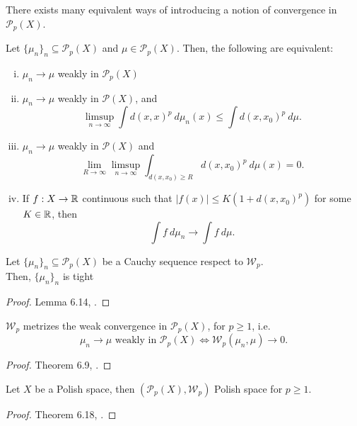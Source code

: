 \documentclass[../main.tex]{subfiles}
\begin{document}
There exists many equivalent ways of introducing a notion of convergence in $\mathcal{P}_p(X)$.

\begin{proposition}
    \label{prop:equiv_statement_weak_conv_P_p(X)}
    Let $\{\mu_n\}_n\subseteq\mathcal{P}_p(X)$ and $\mu\in\mathcal{P}_p(X)$. Then, the following are equivalent:
    \begin{enumerate}[(i)]
        \item $\mu_n \to \mu$ weakly in $\mathcal{P}_p(X)$
        \item $\mu_n \to \mu$ weakly in $\mathcal{P}(X)$, and 
        $$
        \limsup_{n\to\infty} \int d(x, x)^p \ d\mu_n(x) \leq \int d(x, x_0)^p \ d\mu.
        $$
        \item $\mu_n\to \mu$ weakly in $\mathcal{P}(X)$ and
        $$
        \lim_{R\to\infty} \limsup_{n\to\infty} \int_{d(x, x_0)\geq R} d(x, x_0)^p \ d\mu(x) = 0.
        $$
        \item If $f: X\to \mathbb{R}$ continuous such that $|f(x)|\leq K(1+d(x, x_0)^p)$ for some $K\in\mathbb{R}$, then
        $$
        \int f \ d\mu_n \to \int f \ d\mu. 
        $$
    \end{enumerate}
\end{proposition}

\begin{lemma}
    \label{lemma:cauchy_in_P_p(X)}
    Let $\{\mu_n\}_n\subseteq \mathcal{P}_p(X)$ be a Cauchy sequence respect to $\mathcal{W}_p$. \\
    Then, $\{\mu_n\}_n$ is tight
\end{lemma}
\begin{proof}
    Lemma 6.14, \cite{villani2009optimal}.
\end{proof}

\begin{theorem}
    $\mathcal{W}_p$ metrizes the weak convergence in $\mathcal{P}_p(X)$, for $p\geq 1$, i.e. $$\mu_n\to\mu \text{ weakly in } \mathcal{P}_p(X) \iff \mathcal{W}_p(\mu_n, \mu) \to 0.$$
\end{theorem}
\begin{proof}
    Theorem 6.9, \cite{villani2009optimal}.
\end{proof}

\begin{theorem}
    Let $X$ be a Polish space, then $(\mathcal{P}_p(X), \mathcal{W}_p)$ Polish space for $p\geq 1$.
\end{theorem}
\begin{proof}
    Theorem 6.18, \cite{villani2009optimal}.
\end{proof}
\end{document}
